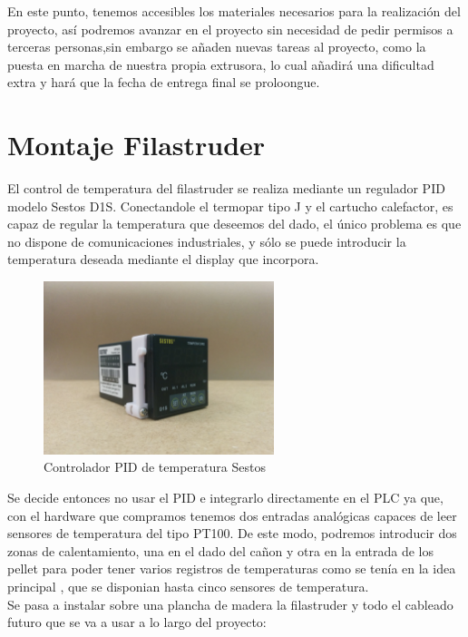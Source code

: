 En este punto, tenemos accesibles los materiales necesarios para la realización del proyecto,  así podremos avanzar en el proyecto sin necesidad de pedir permisos a terceras personas,sin embargo se añaden nuevas tareas al proyecto, como la puesta en marcha de nuestra propia extrusora, lo cual añadirá una dificultad extra y hará que la fecha de entrega final se proloongue.\\

\section{Montaje Filastruder}
\label{sec:filastruder}
El control de temperatura del filastruder se realiza mediante un regulador PID modelo Sestos D1S. Conectandole el termopar tipo J y el cartucho calefactor, es capaz de regular la temperatura que deseemos del dado, el único problema es que no dispone de comunicaciones industriales, y sólo se puede introducir la temperatura deseada mediante el display que incorpora.
   	\begin{figure}[H]
            \centering
            \includegraphics[width=0.6\textwidth]{images/filaextruder/IMG_20150814_123957.jpg}
            \caption{Controlador PID de temperatura Sestos}
            \label{fig:hardware_sestos}
    \end{figure}

Se decide entonces no usar el PID e integrarlo directamente en el PLC ya que, con el hardware que compramos tenemos dos entradas analógicas capaces de leer sensores de temperatura del tipo PT100. De este modo, podremos introducir dos zonas de calentamiento, una en el dado del cañon y otra en la entrada de los pellet para poder tener varios registros de temperaturas como se tenía en la idea principal , que se disponian hasta cinco sensores de temperatura.\\

Se pasa a instalar sobre una plancha de madera la filastruder y todo el cableado futuro que se va a usar a lo largo del proyecto:

